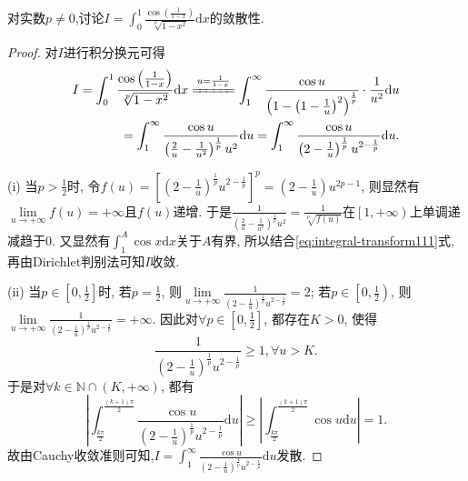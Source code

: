 \documentclass[../../main.tex]{subfiles}%
\begin{document}
\begin{example}
对实数$p\ne 0$,讨论$I = \int_0^1{\frac{\cos(\frac{1}{1 - x})}{\sqrt[p]{1 - x^2}}\mathrm{d}x}$的敛散性.
\end{example}
\begin{proof}
对$I$进行积分换元可得
\begin{align}
I=\int_0^1{\frac{\cos\left(\frac{1}{1-x}\right)}{\sqrt[p]{1-x^2}}\mathrm{d}x}\xlongequal{u=\frac{1}{1-x}}\int_1^{\infty}{\frac{\cos u}{\left( 1-\left( 1-\frac{1}{u} \right) ^2 \right) ^{\frac{1}{p}}}\cdot \frac{1}{u^2}\mathrm{d}u} \notag \\
=\int_1^{\infty}{\frac{\cos u}{\left( \frac{2}{u}-\frac{1}{u^2} \right) ^{\frac{1}{p}}u^2}\mathrm{d}u}=\int_1^{\infty}{\frac{\cos u}{\left( 2-\frac{1}{u} \right) ^{\frac{1}{p}}u^{2-\frac{1}{p}}}\mathrm{d}u}.\label{eq:integral-transform111}
\end{align}

(i) 当$p>\frac{1}{2}$时, 令$f\left( u \right) =\left[ \left( 2-\frac{1}{u} \right) ^{\frac{1}{p}}u^{2-\frac{1}{p}} \right] ^p=\left( 2-\frac{1}{u} \right) u^{2p-1}$, 则显然有$\underset{u\rightarrow +\infty}{\lim}f\left( u \right) =+\infty$且$f\left( u \right)$递增. 于是$\frac{1}{\left( \frac{2}{u}-\frac{1}{u^2} \right) ^{\frac{1}{p}}u^2}=\frac{1}{\sqrt[p]{f\left( u \right)}}$在$\left[ 1,+\infty \right)$上单调递减趋于$0$. 又显然有$\int_1^A{\cos x\mathrm{d}x}$关于$A$有界, 所以结合\eqref{eq:integral-transform111}式, 再由Dirichlet判别法可知$I$收敛.

(ii) 当$p\in \left[ 0,\frac{1}{2} \right]$时, 若$p=\frac{1}{2}$, 则$\underset{u\rightarrow +\infty}{\lim}\frac{1}{\left( 2-\frac{1}{u} \right) ^{\frac{1}{p}}u^{2-\frac{1}{p}}}=2$; 若$p\in \left[ 0,\frac{1}{2} \right)$, 则$\underset{u\rightarrow +\infty}{\lim}\frac{1}{\left( 2-\frac{1}{u} \right) ^{\frac{1}{p}}u^{2-\frac{1}{p}}}=+\infty$. 因此对$\forall p\in \left[ 0,\frac{1}{2} \right]$, 都存在$K>0$, 使得
$$\frac{1}{\left( 2-\frac{1}{u} \right) ^{\frac{1}{p}}u^{2-\frac{1}{p}}}\geqslant 1,\forall u>K.$$
于是对$\forall k\in \mathbb{N} \cap \left( K,+\infty \right)$, 都有
$$\left| \int_{\frac{k\pi}{2}}^{\frac{\left( k+1 \right) \pi}{2}}{\frac{\cos u}{\left( 2-\frac{1}{u} \right) ^{\frac{1}{p}}u^{2-\frac{1}{p}}}\mathrm{d}u} \right|\geqslant \left| \int_{\frac{k\pi}{2}}^{\frac{\left( k+1 \right) \pi}{2}}{\cos u\mathrm{d}u} \right|=1.$$
故由Cauchy收敛准则可知,$I=\int_1^{\infty}{\frac{\cos u}{\left( 2-\frac{1}{u} \right) ^{\frac{1}{p}}u^{2-\frac{1}{p}}}\mathrm{d}u}$发散.


\end{proof}
\end{document}
